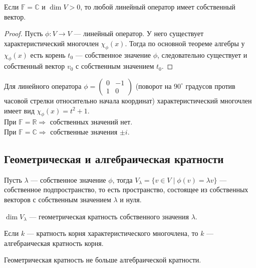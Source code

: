 \begin{Statement}
	Если $\mathbb{F} = \mathbb{C}$ и $\dim V > 0$, то любой линейный оператор имеет собственный вектор.
\end{Statement}

\begin{proof}
	Пусть $\phi: V \to V$ --- линейный оператор. У него существует характеристический многочлен $\chi_\phi(x)$. Тогда по основной теореме алгебры у $\chi_\phi(x)$ есть корень $t_0$ --- собственное значение $\phi$, следовательно существует и собственный вектор $v_0$  с собственным значением $t_0$.
\end{proof}

\begin{Examples}
	Для линейного оператора $\phi = \begin{pmatrix}
    0& -1 \\
    1& 0
    \end{pmatrix}$
    (поворот на $90^\circ$ градусов против часовой стрелки относительно начала координат) характеристический многочлен имеет вид $\chi_\phi(x) = t^2+1$.
    \\ При $\mathbb{F}  = \mathbb{R} \Rightarrow$ собственных значений нет.
    \\ При $\mathbb{F} = \mathbb{C} \Rightarrow$ собственные значения $\pm i$.
\end{Examples}

\subsection*{Геометрическая и алгебраическая кратности}

\begin{Def}
	Пусть $\lambda$ --- собственное значение $\phi$, тогда $V_\lambda = \{v \in V \; | \; \phi(v) = \lambda v\}$ --- собственное подпространство, то есть пространство, состоящее из собственных векторов с собственным значением $\lambda$ и нуля.
\end{Def}

\begin{Def}
	$\dim V_\lambda$ --- геометрическая кратность собственного значения $\lambda$.
\end{Def}

\begin{Def}
	Если $k$ --- кратность корня характеристического многочлена, то $k$ --- алгебраическая кратность корня.
\end{Def}

\begin{Statement}
	Геометрическая кратность не больше алгебраической кратности.
\end{Statement}

